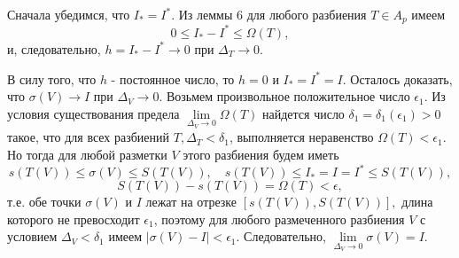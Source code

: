 \par\parindent=1cm Сначала убедимся, что $I_*=I^*$. Из леммы 6 для любого разбиения $T\in A_p$ имеем $$0\le I_*-I^*\le \Omega(T),$$ и, следовательно, $h=I_*-I^*\to 0$ при $\Delta_T\to 0.$
\par\parindent=1cm В силу того, что $h$ - постоянное число, то $h=0$ и $I_*=I^*=I.$ Осталось доказать, что $\sigma(V)\to I$ при $\Delta_V\to 0.$ Возьмем произвольное положительное число $\epsilon_1$. Из условия существования предела $\lim\limits_{\Delta_V\to 0}{\Omega(T)}$ найдется число $\delta_1=\delta_1(\epsilon_1)>0$ такое, что для всех разбиений $T, \Delta_T<\delta_1$,  выполняется неравенство $\Omega(T)<\epsilon_1.$ Но тогда для любой разметки $V$ этого разбиения будем иметь $$s(T(V))\le\sigma(V)\le S(T(V)),\quad s(T(V))\le I_*=I=I^*\le S(T(V)),$$ $$ S(T(V))-s(T(V))=\Omega(T)<\epsilon,$$ т.е. обе точки $\sigma(V)$ и $I$ лежат на отрезке $[s(T(V)), S(T(V))],$ длина которого не превосходит $\epsilon_1$, поэтому для любого размеченного разбиения $V$ с условием $\Delta_V<\delta_1$ имеем $|\sigma(V)-I|<\epsilon_1$. Следовательно, $\lim\limits_{\Delta_V\to 0}{\sigma(V)}=I.$


